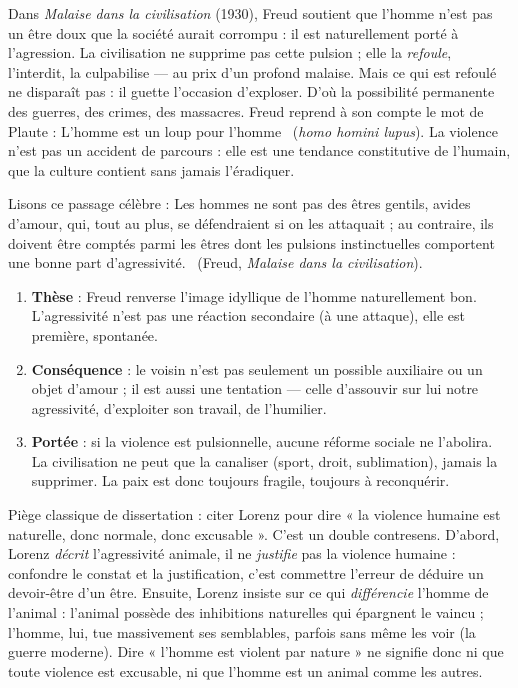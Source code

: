 \documentclass[11pt]{article}
\begin{document}
\begin{propriete}
Dans \emph{Malaise dans la civilisation} (1930), Freud soutient que l'homme n'est pas un être doux que la société aurait corrompu : il est naturellement porté à l'agression. La civilisation ne supprime pas cette pulsion ; elle la \emph{refoule}, l'interdit, la culpabilise — au prix d'un profond malaise. Mais ce qui est refoulé ne disparaît pas : il guette l'occasion d'exploser. D'où la possibilité permanente des guerres, des crimes, des massacres. Freud reprend à son compte le mot de Plaute : \guillemotleft L'homme est un loup pour l'homme \guillemotright\ (\emph{homo homini lupus}). La violence n'est pas un accident de parcours : elle est une tendance constitutive de l'humain, que la culture contient sans jamais l'éradiquer.
\end{propriete}

\begin{experience}
Lisons ce passage célèbre : \guillemotleft Les hommes ne sont pas des êtres gentils, avides d'amour, qui, tout au plus, se défendraient si on les attaquait ; au contraire, ils doivent être comptés parmi les êtres dont les pulsions instinctuelles comportent une bonne part d'agressivité. \guillemotright\ (Freud, \emph{Malaise dans la civilisation}).
\begin{enumerate}
\item \textbf{Thèse} : Freud renverse l'image idyllique de l'homme naturellement bon. L'agressivité n'est pas une réaction secondaire (à une attaque), elle est première, spontanée.
\item \textbf{Conséquence} : le voisin n'est pas seulement un possible auxiliaire ou un objet d'amour ; il est aussi une tentation — celle d'assouvir sur lui notre agressivité, d'exploiter son travail, de l'humilier.
\item \textbf{Portée} : si la violence est pulsionnelle, aucune réforme sociale ne l'abolira. La civilisation ne peut que la canaliser (sport, droit, sublimation), jamais la supprimer. La paix est donc toujours fragile, toujours à reconquérir.
\end{enumerate}
\end{experience}

\begin{attention}
Piège classique de dissertation : citer Lorenz pour dire « la violence humaine est naturelle, donc normale, donc excusable ». C'est un double contresens. D'abord, Lorenz \emph{décrit} l'agressivité animale, il ne \emph{justifie} pas la violence humaine : confondre le constat et la justification, c'est commettre l'erreur de déduire un devoir-être d'un être. Ensuite, Lorenz insiste sur ce qui \emph{différencie} l'homme de l'animal : l'animal possède des inhibitions naturelles qui épargnent le vaincu ; l'homme, lui, tue massivement ses semblables, parfois sans même les voir (la guerre moderne). Dire « l'homme est violent par nature » ne signifie donc ni que toute violence est excusable, ni que l'homme est un animal comme les autres.
\end{attention}
\end{document}
